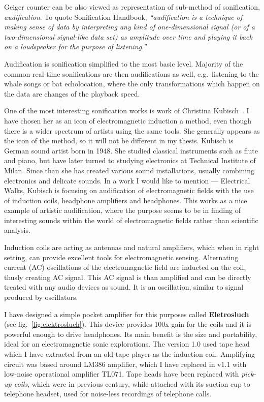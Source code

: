 \documentclass[12pt,a4paper,oneside]{report}
\begin{document}
Geiger counter can be also viewed as representation of sub-method of sonification, \emph{audification}. To quote Sonification Handbook,  \emph{``audification is a technique of making sense of data by interpreting any kind of one-dimensional signal (or of a two-dimensional signal-like data set) as amplitude over time and playing it back on a loudspeaker for the purpose of listening.''}~\cite[p.~301]{audif}

Audification is sonification simplified to the most basic level. Majority of the common real-time sonifications are then audifications as well, e.g.\ listening to the whale songs or bat echolocation, where the only transformations which happen on the data are changes of the playback speed.

One of the most interesting sonification works is work of Christina Kubisch~\cite{ChKubisch2012}. I have chosen her as an icon of electromagnetic induction a method, even though there is a wider spectrum of artists using the same tools. She generally appears as the icon of the method, so it will not be different in my thesis. Kubisch is German sound artist born in 1948. She studied classical instruments such as flute and piano, but have later turned to studying electronics at Technical Institute of Milan. Since than she has created various sound installations, usually combining electronics and delicate sounds. In a work I would like to mention --- Electrical Walks, Kubisch is focusing on audification of electromagnetic fields with the use of induction coils, headphone amplifiers and headphones. This works as a nice example of artistic audification, where the purpose seems to be in finding of interesting sounds within the world of electromagnetic fields rather than scientific analysis. 

Induction coils are acting as antennas and natural amplifiers, which when in right setting, can provide excellent tools for electromagnetic sensing. Alternating current (AC) oscillations of the electromagnetic field are inducted on the coil, thusly creating AC signal. This AC signal is than amplified and can be directly treated with any audio devices as sound. It is an oscillation, similar to signal produced by oscillators.

I have designed a simple pocket amplifier for this purposes called \textbf{Eletrosluch} (see fig.~\ref{fig:elektrosluch}). This device provides 100x gain for the coils and it is powerful enough to drive headphones. Its main benefit is the size and portability, ideal for an electromagnetic sonic explorations. The version 1.0 used tape head which I have extracted from an old tape player as the induction coil. Amplifying circuit was based around LM386 amplifier, which I have replaced in v1.1 with low-noise operational amplifier TL071. Tape heads have been replaced with \emph{pick-up coils}, which were in previous century, while attached with its suction cup to telephone headset, used for noise-less recordings of telephone calls. 
\end{document}
